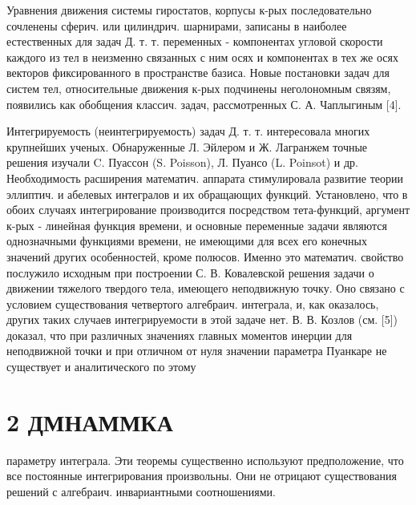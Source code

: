 \documentclass[10pt]{article}
\begin{document}
Уравнения движения системы гиростатов, корпусы к-рых последовательно сочленены сферич. или цилиндрич. шарнирами, записаны в наиболее естественных для задач Д. т. т. переменных - компонентах угловой скорости каждого из тел в неизменно связанных с ним осях и компонентах в тех же осях векторов фиксированного в пространстве базиса. Новые постановки задач для систем тел, относительные движения к-рых подчинены неголономным связям, появились как обобщения классич. задач, рассмотренных С. А. Чаплыгиным [4].



Интегрируемость (неинтегрируемость) задач Д. т. т. интересовала многих крупнейших ученых. Обнаруженные Л. Эйлером и Ж. Лагранжем точные решения изучали C. Пуассон (S. Poisson), Л. Пуансо (L. Poinsot) и др. Необходимость расширения математич. аппарата стимулировала развитие теории эллиптич. и абелевых интегралов и их обращающих функций. Установлено, что в обоих случаях интегрирование производится посредством тета-функций, аргумент к-рых - линейная функция времени, и основные переменные задачи являются однозначными функциями времени, не имеющими для всех его конечных значений других особенностей, кроме полюсов. Именно это математич. свойство послужило исходным при построении С. В. Ковалевской решения задачи о движении тяжелого твердого тела, имеющего неподвижную точку. Оно связано с условием существования четвертого алгебраич. интеграла, и, как оказалось, других таких случаев интегрируемости в этой задаче нет. В. В. Козлов (см. [5]) доказал, что при различных значениях главных моментов инерции для неподвижной точки и при отличном от нуля значении параметра Пуанкаре не существует и аналитического по этому



\section{2 ДМНАММКА}

параметру интеграла. Эти теоремы существенно используют предположение, что все постоянные интегрирования произвольны. Они не отрицают существования решений с алгебраич. инвариантными соотношениями.
\end{document}
